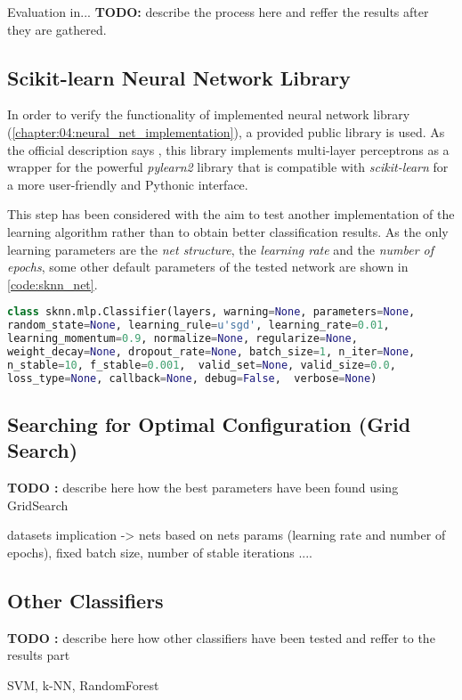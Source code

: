 Evaluation in... \textbf{TODO:} describe the process here and reffer the results after they are gathered.


\subsection{Scikit-learn Neural Network Library} \label{ssec:sknn}
In order to verify the functionality of implemented neural network library (\cref{chapter:04:neural_net_implementation}), a provided public library is used. As the official description says \citep{misc:sknn}, this library implements multi-layer perceptrons as a wrapper for the powerful \textit{pylearn2} library that is compatible with \textit{scikit-learn} for a more user-friendly and Pythonic interface.

This step has been considered with the aim to test another implementation of the learning algorithm rather than to obtain better classification results. As the only learning parameters are the \textit{net structure}, the \textit{learning rate} and the \textit{number of epochs}, some other default parameters of the tested network are shown in \cref{code:sknn_net}.

\begin{lstlisting}[language=Python, caption={Sknn classifier specification \citep{misc:sknn}}, label=code:sknn_net]
class sknn.mlp.Classifier(layers, warning=None, parameters=None, 
random_state=None, learning_rule=u'sgd', learning_rate=0.01, 
learning_momentum=0.9, normalize=None, regularize=None, 
weight_decay=None, dropout_rate=None, batch_size=1, n_iter=None, 
n_stable=10, f_stable=0.001,  valid_set=None, valid_size=0.0, 
loss_type=None, callback=None, debug=False,  verbose=None)
\end{lstlisting}

\subsection{Searching for Optimal Configuration (Grid Search)} \label{ssec:grid_search}
\textbf{TODO :} describe here how the best parameters have been found using GridSearch

datasets implication -> nets based on nets params (learning rate and number of epochs), fixed batch size, number of stable iterations ....

\subsection{Other Classifiers} \label{ssec:other_classifiers}
\textbf{TODO :} describe here how other classifiers have been tested and reffer to the results part

SVM, k-NN, RandomForest